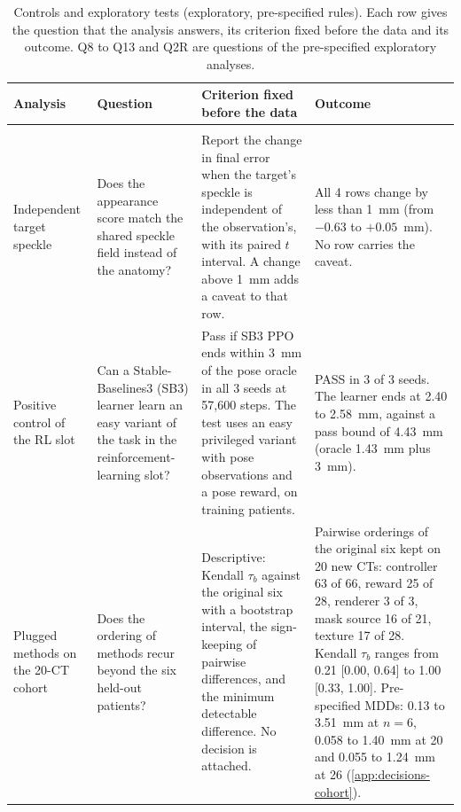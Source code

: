 
\begin{table}[tp]
\renewcommand{\baselinestretch}{1}\scriptsize
\caption{Controls and exploratory tests (exploratory, pre-specified rules). Each row gives the question that the analysis answers, its criterion fixed before the data and its outcome. Q8 to Q13 and Q2R are questions of the pre-specified exploratory analyses.}
\label{tab:checks}
\centering
\setlength{\tabcolsep}{4pt}
\begin{tabularx}{\textwidth}{@{}>{\raggedright\arraybackslash}p{} >{\raggedright\arraybackslash\hsize=0.75\hsize}X >{\raggedright\arraybackslash\hsize=1.25\hsize}X >{\raggedright\arraybackslash}X@{}}
\toprule
Analysis & Question & Criterion fixed before the data & Outcome \\
\midrule
\multicolumn{4}{@{}l}{\textit{Controls}} \\
Independent target speckle & Does the appearance score match the shared speckle field instead of the anatomy? & Report the change in final error when the target's speckle is independent of the observation's, with its paired $t$ interval. A change above 1~mm adds a caveat to that row. & All 4 rows change by less than 1~mm (from $-0.63$ to $+0.05$~mm). No row carries the caveat. \\[2pt]
Positive control of the RL slot & Can a Stable-Baselines3 (SB3) learner learn an easy variant of the task in the reinforcement-learning slot? & Pass if SB3 PPO ends within 3~mm of the pose oracle in all 3 seeds at 57,600 steps. The test uses an easy privileged variant with pose observations and a pose reward, on training patients. & PASS in 3 of 3 seeds. The learner ends at 2.40 to 2.58~mm, against a pass bound of 4.43~mm (oracle 1.43~mm plus 3~mm). \\[2pt]
Plugged methods on the 20-CT cohort & Does the ordering of methods recur beyond the six held-out patients? & Descriptive: Kendall $\tau_b$ against the original six with a bootstrap interval, the sign-keeping of pairwise differences, and the minimum detectable difference. No decision is attached. & Pairwise orderings of the original six kept on 20 new CTs: controller 63 of 66, reward 25 of 28, renderer 3 of 3, mask source 16 of 21, texture 17 of 28. Kendall $\tau_b$ ranges from 0.21 [0.00, 0.64] to 1.00 [0.33, 1.00]. Pre-specified MDDs: 0.13 to 3.51~mm at $n = 6$, 0.058 to 1.40~mm at 20 and 0.055 to 1.24~mm at 26 (\ref{app:decisions-cohort}). \\[2pt]
\bottomrule
\end{tabularx}
\end{table}
